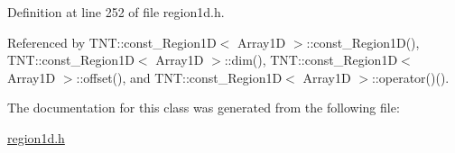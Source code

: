 Definition at line 252 of file region1d.h.



Referenced by TNT::const\_\-Region1D$<$ Array1D $>$::const\_\-Region1D(), TNT::const\_\-Region1D$<$ Array1D $>$::dim(), TNT::const\_\-Region1D$<$ Array1D $>$::offset(), and TNT::const\_\-Region1D$<$ Array1D $>$::operator()().



The documentation for this class was generated from the following file:\begin{DoxyCompactItemize}
\item 
\hyperlink{region1d_8h}{region1d.h}\end{DoxyCompactItemize}
